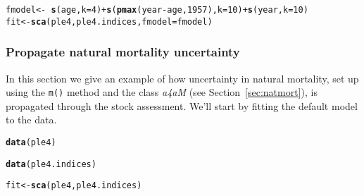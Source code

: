 \documentclass[a4paper,english,10pt]{article}\usepackage[]{graphicx}\usepackage[]{color}
\makeatletter
\newcommand{\hlnum}[1]{\textcolor[rgb]{0.686,0.059,0.569}{#1}}%
\newcommand{\hlopt}[1]{\textcolor[rgb]{0,0,0}{#1}}%
\newcommand{\hlstd}[1]{\textcolor[rgb]{0.345,0.345,0.345}{#1}}%
\newcommand{\hlkwb}[1]{\textcolor[rgb]{0.69,0.353,0.396}{#1}}%
\newcommand{\hlkwc}[1]{\textcolor[rgb]{0.333,0.667,0.333}{#1}}%
\newcommand{\hlkwd}[1]{\textcolor[rgb]{0.737,0.353,0.396}{\textbf{#1}}}%
\newenvironment{kframe}{%
 \def\at@end@of@kframe{}%
 \ifinner\ifhmode%
  \def\at@end@of@kframe{\end{minipage}}%
  \begin{minipage}{\columnwidth}%
 \fi\fi%
 \def\FrameCommand##1{\hskip\@totalleftmargin \hskip-\fboxsep
 \colorbox{shadecolor}{##1}\hskip-\fboxsep
     \hskip-\linewidth \hskip-\@totalleftmargin \hskip\columnwidth}%
 \MakeFramed {\advance\hsize-\width
   \@totalleftmargin\z@ \linewidth\hsize
   \@setminipage}}%
 {\par\unskip\endMakeFramed%
 \at@end@of@kframe}
\newenvironment{knitrout}{}{} %
\newcommand{\code}[1]{{\texttt{#1}}}
\newcommand{\class}[1]{{\textit{#1}}}
\makeatother
\begin{document}
\begin{knitrout}
\color{fgcolor}\begin{kframe}
\begin{alltt}
\hlstd{fmodel} \hlkwb{<-} \hlopt{~} \hlkwd{s}\hlstd{(age,} \hlkwc{k} \hlstd{=} \hlnum{4}\hlstd{)} \hlopt{+} \hlkwd{s}\hlstd{(}\hlkwd{pmax}\hlstd{(year} \hlopt{-} \hlstd{age,} \hlnum{1957}\hlstd{),} \hlkwc{k} \hlstd{=} \hlnum{10}\hlstd{)} \hlopt{+} \hlkwd{s}\hlstd{(year,} \hlkwc{k} \hlstd{=} \hlnum{10}\hlstd{)}
\hlstd{fit} \hlkwb{<-} \hlkwd{sca}\hlstd{(ple4, ple4.indices,} \hlkwc{fmodel}\hlstd{=fmodel)}
\end{alltt}


{\ttfamily\noindent\bfseries{}}\end{kframe}
\end{knitrout}

\begin{knitrout}
\color{fgcolor}\begin{kframe}


{\ttfamily\noindent\bfseries{}}\end{kframe}
\end{knitrout}

\subsubsection{Propagate natural mortality uncertainty}

In this section we give an example of how uncertainty in natural mortality, set up using the \code{m()} method and the class \class{a4aM} (see Section~\ref{sec:natmort}), is propagated through the stock assessment. We'll start by fitting the default model to the data. 

\begin{knitrout}
\color{fgcolor}\begin{kframe}
\begin{alltt}
\hlkwd{data}\hlstd{(ple4)}
\end{alltt}


{\ttfamily\noindent\color{warningcolor}{\#\# Warning: data set 'ple4' not found}}\begin{alltt}
\hlkwd{data}\hlstd{(ple4.indices)}
\end{alltt}


{\ttfamily\noindent\color{warningcolor}{\#\# Warning: data set 'ple4.indices' not found}}\begin{alltt}
\hlstd{fit} \hlkwb{<-} \hlkwd{sca}\hlstd{(ple4, ple4.indices)}
\end{alltt}


{\ttfamily\noindent\bfseries{}}\end{kframe}
\end{knitrout}
\end{document}
